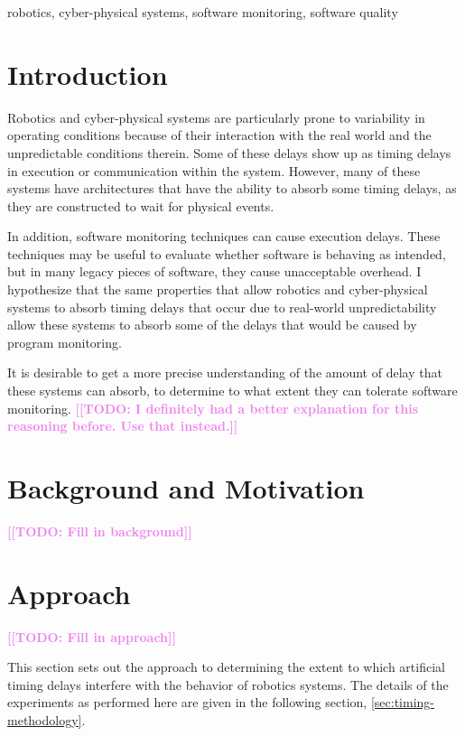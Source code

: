 \documentclass[conference]{IEEEtran}
\newcommand{\todo}[1]{\textcolor{violet}{{\bfseries [[TODO: #1]]}}}
\begin{document}
\begin{IEEEkeywords}
robotics, cyber-physical systems, software monitoring, software quality
\end{IEEEkeywords}

\section{Introduction}
Robotics and cyber-physical systems are particularly prone to variability in operating conditions because of their interaction with the real world and the unpredictable conditions therein. Some of these delays show up as timing delays in execution or communication within the system. However, many of these systems have architectures that have the ability to absorb some timing delays, as they are constructed to wait for physical events.

In addition, software monitoring techniques can cause execution delays. These techniques may be useful to evaluate whether software is behaving as intended, but in many legacy pieces of software, they cause unacceptable overhead. I hypothesize that the same properties that allow robotics and cyber-physical systems to absorb timing delays that occur due to real-world unpredictability allow these systems to absorb some of the delays that would be caused by program monitoring.

It is desirable to get a more precise understanding of the amount of delay that these systems can absorb, to determine to what extent they can tolerate software monitoring. 
\todo{I definitely had a better explanation for this reasoning before. Use that instead.}

\cite{TimperleyArdu2018}

\section{Background and Motivation}
\label{sec:background}
\todo{Fill in background}

\section{Approach}
\label{sec:approach}
\todo{Fill in approach}

This section sets out the approach to determining the extent to which artificial timing delays interfere with the behavior of robotics systems.
The details of the experiments as performed here are given in the following
section, \ref{sec:timing-methodology}.
\end{document}
